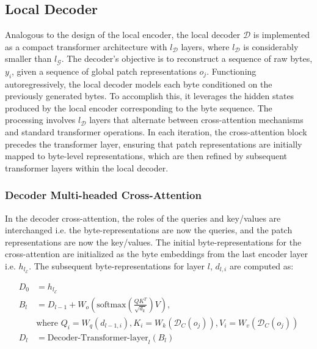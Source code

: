 \subsection{Local Decoder} 

Analogous to the design of the local encoder, the local decoder $\mathcal{D}$ is implemented as a compact transformer architecture with $l_{\mathcal{D}}$ layers, where $l_{\mathcal{D}}$ is considerably smaller than $l_{\mathcal{G}}$. The decoder’s objective is to reconstruct a sequence of raw bytes, $y_i$, given a sequence of global patch representations $o_j$. Functioning autoregressively, the local decoder models each byte conditioned on the previously generated bytes. To accomplish this, it leverages the hidden states produced by the local encoder corresponding to the byte sequence. The processing involves $l_{\mathcal{D}}$ layers that alternate between cross-attention mechanisms and standard transformer operations. In each iteration, the cross-attention block precedes the transformer layer, ensuring that patch representations are initially mapped to byte-level representations, which are then refined by subsequent transformer layers within the local decoder.

\subsubsection{Decoder Multi-headed Cross-Attention} 

In the decoder cross-attention, the roles of the queries and key/values are interchanged i.e. the byte-representations are now the queries, and the patch representations are now the key/values. The initial byte-representations for the cross-attention are initialized as the byte embeddings from the last encoder layer i.e. $h_{l_{\mathcal{E}}}$. The subsequent byte-representations for layer $l$, $d_{l,i}$ are computed as:

\begin{align}
D_0 &= h_{l_{\mathcal{E}}} \\
B_l &= D_{l-1} + W_o\left(\text{softmax}\left(\frac{QK^T}{\sqrt{d_k}}\right)V\right), \\
  &\text{where } Q_i = W_q(d_{l-1,i}), K_i = W_k(\mathcal{D}_C(o_j)), V_i = W_v(\mathcal{D}_C(o_j)) \\
  D_l &= \text{Decoder-Transformer-layer}_l(B_l)
\end{align}

